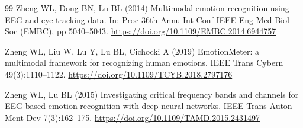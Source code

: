 \documentclass[11pt,a4paper]{article}
\begin{document}
\begin{thebibliography}{99}
 Zheng WL, Dong BN, Lu BL (2014) Multimodal emotion recognition using EEG and eye tracking data. In: Proc 36th Annu Int Conf IEEE Eng Med Biol Soc (EMBC), pp 5040--5043. \url{https://doi.org/10.1109/EMBC.2014.6944757}

 Zheng WL, Liu W, Lu Y, Lu BL, Cichocki A (2019) EmotionMeter: a multimodal framework for recognizing human emotions. IEEE Trans Cybern 49(3):1110--1122. \url{https://doi.org/10.1109/TCYB.2018.2797176}

 Zheng WL, Lu BL (2015) Investigating critical frequency bands and channels for EEG-based emotion recognition with deep neural networks. IEEE Trans Auton Ment Dev 7(3):162--175. \url{https://doi.org/10.1109/TAMD.2015.2431497}

\end{thebibliography}
\end{document}
